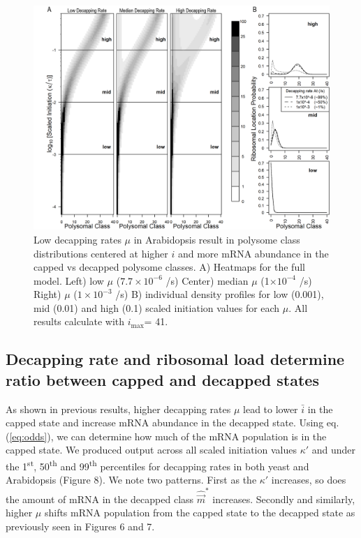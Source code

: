 \documentclass[a4,center,fleqn]{NAR}
\newcommand{\imax}{\ensuremath{{i_{\max}}}\xspace}
\newcommand{\mvec}{\ensuremath{\vec{m}}\xspace}
\newcommand{\mvechat}{\ensuremath{\hat{\mvec}}\xspace}
\newcommand{\mvechatstar}{\ensuremath{\mvechat^*}\xspace}
\newcommand{\MRL}{\ensuremath{\bar{i}}\xspace}
\begin{document}
\begin{figure}[!ht]
\begin{center}
\centering
\includegraphics[width=140mm]{Images/2023-07-09_Figure2_At_Marking_Rate_range_medianlength_with_labels.png}
\caption{Low decapping rates $\mu$ in Arabidopsis result in polysome class distributions centered at higher $i$ and more mRNA abundance in the capped vs decapped polysome classes.  A)  Heatmaps for the full model. Left) low $\mu$ ($7.7\times 10^{-6}$ /s) Center) median $\mu$ (1$\times 10^{-4}$ /s) Right) $\mu$ ($1\times 10^{-3}$ /s) B) individual density profiles for low (0.001), mid (0.01) and high (0.1) scaled initiation values for each $\mu$. All results calculate with \imax = 41.}
\end{center}
\end{figure}



\subsection{Decapping rate and ribosomal load determine ratio between capped and decapped states}
 As shown in previous results, higher decapping rates $\mu$ lead to lower \MRL in the capped state and increase mRNA abundance in the decapped state.
Using eq. (\ref{eq:odds}), we can determine how much of the mRNA population is in the capped state.
We produced output across all scaled initiation values $\kappa'$ and under the 1\textsuperscript{st}, 50\textsuperscript{th} and 99\textsuperscript{th} percentiles for decapping rates in both yeast and Arabidopsis (Figure 8). 
We note two patterns. First as the $\kappa'$ increases, so does the amount of mRNA in the decapped class  \mvechatstar increases. 
Secondly and similarly, higher $\mu$ shifts mRNA population from the capped state to the decapped state as previously seen in Figures 6 and 7.  
\end{document}
